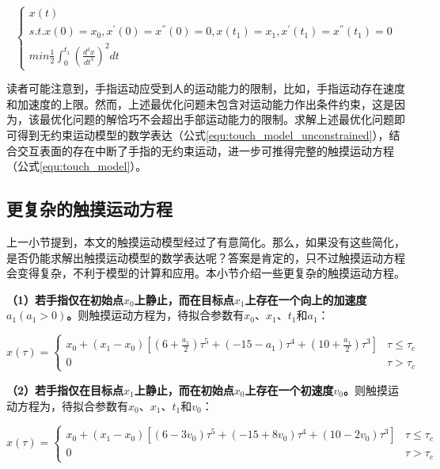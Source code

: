 \begin{equation}
	\begin{cases}
		x(t) \\
		s.t. x(0)=x_0,x^{'}(0)=x^{''}(0)=0,x(t_1)=x_1,x^{'}(t_1)=x^{''}(t_1)=0 \\
		min\frac{1}{2}\int_{0}^{t_1}\left(\frac{d^3x}{dt^3}\right)^2dt
	\end{cases}
\end{equation}

读者可能注意到，手指运动应受到人的运动能力的限制，比如，手指运动存在速度和加速度的上限。然而，上述最优化问题未包含对运动能力作出条件约束，这是因为，该最优化问题的解恰巧不会超出手部运动能力的限制。求解上述最优化问题即可得到无约束运动模型的数学表达（公式\ref{equ:touch_model_unconstrained}），结合交互表面的存在中断了手指的无约束运动，进一步可推得完整的触摸运动方程（公式\ref{equ:touch_model}）。

\subsection{更复杂的触摸运动方程}\label{section:complex_model}

上一小节提到，本文的触摸运动模型经过了有意简化。那么，如果没有这些简化，是否仍能求解出触摸运动模型的数学表达呢？答案是肯定的，只不过触摸运动方程会变得复杂，不利于模型的计算和应用。本小节介绍一些更复杂的触摸运动方程。

\textbf{（1）若手指仅在初始点$x_0$上静止，而在目标点$x_1$上存在一个向上的加速度$a_1(a_1>0)$。}则触摸运动方程为，待拟合参数有$x_0$、$x_1$、$t_1$和$a_1$：

\begin{equation}
	x(\tau)=
	\begin{cases}
		x_0+(x_1-x_0)[(6+\frac{a_1}{2})\tau^5+(-15-a_1)\tau^4+(10+\frac{a_1}{2})\tau^3]& \tau\leq\tau_c \\
		0& \tau>\tau_c
	\end{cases}
	\label{equ:touch_model_a1}
\end{equation}

\textbf{（2）若手指仅在目标点$x_1$上静止，而在初始点$x_0$上存在一个初速度$v_0$。}则触摸运动方程为，待拟合参数有$x_0$、$x_1$、$t_1$和$v_0$：

\begin{equation}
	x(\tau)=
	\begin{cases}
		x_0+(x_1-x_0)[(6-3v_0)\tau^5+(-15+8v_0)\tau^4+(10-2v_0)\tau^3]& \tau\leq\tau_c \\
		0& \tau>\tau_c
	\end{cases}
	\label{equ:touch_model_v0}
\end{equation}


